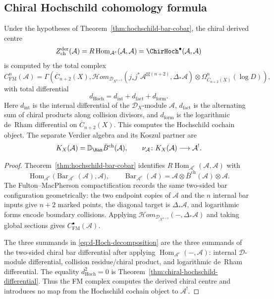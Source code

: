 \subsection{Chiral Hochschild cohomology formula}

\begin{theorem}\label{thm:HH-config-space-formula}
Under the hypotheses of Theorem~\textup{\ref{thm:hochschild-bar-cobar}},
the chiral derived centre
\[
Z^{\mathrm{der}}_{\mathrm{ch}}(\mathcal A)
   =R\operatorname{Hom}_{\mathcal A^e}(\mathcal A,\mathcal A)
   =\ChirHoch^\bullet(\mathcal A,\mathcal A)
\]
is computed by the total complex
\[
C^n_{\mathrm{FM}}(\mathcal A)
=
\Gamma\!\left(
\overline{C}_{n+2}(X),
\mathcal{H}om_{\mathcal{D}_{X^{n+2}}}
\!\left(j_*j^*\mathcal A^{\boxtimes(n+2)},\Delta_*\mathcal A\right)
\otimes \Omega^n_{\overline{C}_{n+2}(X)}(\log D)
\right),
\]
with total differential
\begin{equation}\label{eq:d-Hoch-decomposition}
d_{\mathrm{Hoch}}
=d_{\mathrm{int}}+d_{\mathrm{fact}}+d_{\mathrm{form}} .
\end{equation}
Here $d_{\mathrm{int}}$ is the internal differential of the
$\mathcal D_X$-module $\mathcal A$, $d_{\mathrm{fact}}$ is the
alternating sum of chiral products along collision divisors, and
$d_{\mathrm{form}}$ is the logarithmic de~Rham differential on
$\overline C_{n+2}(X)$. This computes the Hochschild cochain object.
The separate Verdier algebra and its Koszul partner are
\[
K_X(\mathcal A)=\mathbb D_{\Ran}\bar B^{\mathrm{ch}}(\mathcal A),
\qquad
\nu_\mathcal A\colon K_X(\mathcal A)\longrightarrow\mathcal A^!.
\]
\end{theorem}

\begin{proof}
Theorem~\ref{thm:hochschild-bar-cobar} identifies
$R\operatorname{Hom}_{\mathcal A^e}(\mathcal A,\mathcal A)$ with
\[
\operatorname{Hom}_{\mathcal A^e}
\bigl(\operatorname{Bar}_{\mathcal A^e}(\mathcal A),\mathcal A\bigr),
\qquad
\operatorname{Bar}_{\mathcal A^e}(\mathcal A)
=\mathcal A\otimes\bar B^{\mathrm{ch}}(\mathcal A)\otimes\mathcal A .
\]
The Fulton--MacPherson compactification records the same two-sided bar
configuration geometrically: the two endpoint copies of $\mathcal A$
and the $n$ internal bar inputs give $n+2$ marked points, the
diagonal target is $\Delta_*\mathcal A$, and logarithmic forms encode
boundary collisions. Applying
$\mathcal H om_{\mathcal D_{X^{n+2}}}(-,\Delta_*\mathcal A)$ and
taking global sections gives $C^\bullet_{\mathrm{FM}}(\mathcal A)$.

The three summands in \eqref{eq:d-Hoch-decomposition} are the three
summands of the two-sided chiral bar differential after applying
$\operatorname{Hom}_{\mathcal A^e}(-,\mathcal A)$: internal
$\mathcal D$-module differential, collision residue/chiral product,
and logarithmic de~Rham differential. The equality
$d_{\mathrm{Hoch}}^2=0$ is Theorem~\ref{thm:chiral-hochschild-differential}.
Thus the FM complex computes the derived chiral centre and introduces
no map from the Hochschild cochain object to $\mathcal A^!$.
\end{proof}

